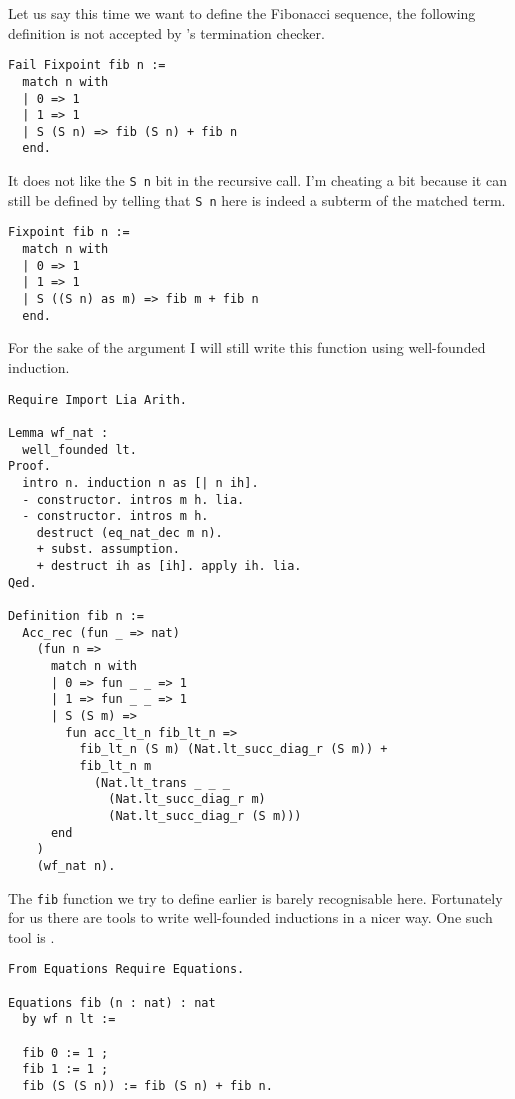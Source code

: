 Let us say this time we want to define the Fibonacci sequence, the following
definition is not accepted by \Coq's termination checker.
\begin{verbatim}
Fail Fixpoint fib n :=
  match n with
  | 0 => 1
  | 1 => 1
  | S (S n) => fib (S n) + fib n
  end.
\end{verbatim}
It does not like the \texttt{S n} bit in the recursive call.
I'm cheating a bit because it can still be defined by telling \Coq that
\texttt{S n} here is indeed a subterm of the matched term.
\begin{verbatim}
Fixpoint fib n :=
  match n with
  | 0 => 1
  | 1 => 1
  | S ((S n) as m) => fib m + fib n
  end.
\end{verbatim}
For the sake of the argument I will still write this function using well-founded
induction.
\begin{verbatim}
Require Import Lia Arith.

Lemma wf_nat :
  well_founded lt.
Proof.
  intro n. induction n as [| n ih].
  - constructor. intros m h. lia.
  - constructor. intros m h.
    destruct (eq_nat_dec m n).
    + subst. assumption.
    + destruct ih as [ih]. apply ih. lia.
Qed.

Definition fib n :=
  Acc_rec (fun _ => nat)
    (fun n =>
      match n with
      | 0 => fun _ _ => 1
      | 1 => fun _ _ => 1
      | S (S m) =>
        fun acc_lt_n fib_lt_n =>
          fib_lt_n (S m) (Nat.lt_succ_diag_r (S m)) +
          fib_lt_n m
            (Nat.lt_trans _ _ _
              (Nat.lt_succ_diag_r m)
              (Nat.lt_succ_diag_r (S m)))
      end
    )
    (wf_nat n).
\end{verbatim}
The \texttt{fib} function we try to define earlier is barely
recognisable here. Fortunately for us there are tools to write well-founded
inductions in a nicer way. One such tool is \Equations.
\begin{verbatim}
From Equations Require Equations.

Equations fib (n : nat) : nat
  by wf n lt :=

  fib 0 := 1 ;
  fib 1 := 1 ;
  fib (S (S n)) := fib (S n) + fib n.
\end{verbatim}
